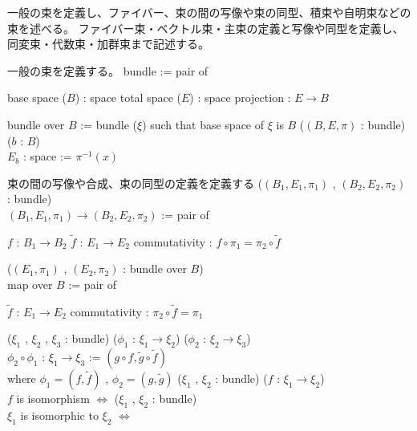 一般の束を定義し、ファイバー、束の間の写像や束の同型、積束や自明束などの束を述べる。
ファイバー束・ベクトル束・主束の定義と写像や同型を定義し、同変束・代数束・加群束まで記述する。

\begin{Definition}
\itemnote
  一般の束を定義する。
\itemdefi
  \Define bundle := pair of
  \begin{itemize}
    \itemenum base space (\(B\)) : space
    \itemenum total space (\(E\)) : space
    \itemenum projection : \(E \to B\)
  \end{itemize}
\itemdefi
  \Define bundle over \(B\) := bundle (\(\xi\)) such that base space of \(\xi\) is \(B\)
\itemdefi
  \For (\((B , E , \pi)\) : bundle) (\(b\) : \(B\)) \\
  \Define \(E_b\) : space := \(\pi^{-1}(x)\)
\end{Definition}

\begin{Definition}
\itemnote
  束の間の写像や合成、束の同型の定義を定義する
\itemdefi
  \For (\((B_1 , E_1 , \pi_1)\) , \((B_2 , E_2 , \pi_2)\) : bundle) \\
  \Define \((B_1 , E_1 , \pi_1) \to (B_2 , E_2 , \pi_2)\) := pair of
  \begin{itemize}
    \itemenum \(f\) : \(B_1 \to B_2\)
    \itemenum \(\tilde{f}\) : \(E_1 \to E_2\)
    \itemwith commutativity : \(f \circ \pi_1 = \pi_2 \circ \tilde{f}\)
  \end{itemize}
\itemdefi
  \For (\((E_1 , \pi_1)\) , \((E_2 , \pi_2)\) : bundle over \(B\)) \\
  \Define map over \(B\) := pair of
  \begin{itemize}
    \itemenum \(\tilde{f}\) : \(E_1 \to E_2\)
    \itemwith commutativity : \(\pi_2 \circ \tilde{f} = \pi_1\)
  \end{itemize}
\itemdefi
  \For (\(\xi_1\) , \(\xi_2\) , \(\xi_3\) : bundle) (\(\phi_1\) : \(\xi_1 \to \xi_2\)) (\(\phi_2\) : \(\xi_2 \to \xi_3\)) \\
  \Define \(\phi_2 \circ \phi_1\) : \(\xi_1 \to \xi_3\) := \((g \circ f , \tilde{g} \circ \tilde{f})\) \\
  where \(\phi_1 = (f , \tilde{f})\) , \(\phi_2 = (g , \tilde{g})\)
\itemdefi
  \For (\(\xi_1\) , \(\xi_2\) : bundle) (\(f\) : \(\xi_1 \to \xi_2\)) \\
  \Define \(f\) is isomorphism \(\iff\) 
\itemdefi
  \For (\(\xi_1\) , \(\xi_2\) : bundle) \\
  \Define \(\xi_1\) is isomorphic to \(\xi_2\) \(\iff\) 
\end{Definition}

